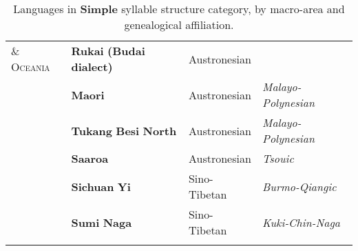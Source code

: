\begin{table}
\begin{tabularx}{\textwidth}{XXXX}
\textsc{\&} \textsc{Oceania} & \textbf{Rukai} \textbf{(Budai} \textbf{dialect)} & Austronesian & \\
\hhline{-~~~} & \textbf{Maori} & Austronesian & \textit{Malayo-Polynesian}\\
& \textbf{Tukang} \textbf{Besi} \textbf{North} & Austronesian & \textit{Malayo-Polynesian}\\
& \textbf{Saaroa} & Austronesian & \textit{Tsouic}\\
& \textbf{Sichuan} \textbf{Yi} & Sino-Tibetan & \textit{Burmo-Qiangic}\\
& \textbf{Sumi} \textbf{Naga} & Sino-Tibetan & \textit{Kuki-Chin-Naga}\\
\hhline{~---}
\lspbottomrule
\end{tabularx}
\caption{\label{tab:key:2.4.} Languages in \textbf{Simple} syllable structure category, by macro-area and genealogical affiliation.}
\end{table}




